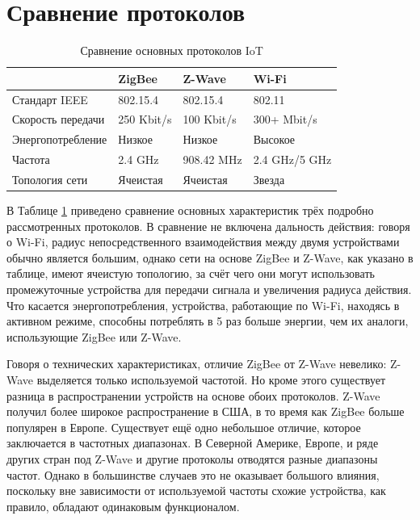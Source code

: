 	
	\section{Сравнение протоколов}
	
		\begin{table}[h]
		\centering
		\begin{tabular}{ | l | l | l | l | }
			\hline
			 & ZigBee & Z-Wave & Wi-Fi \\ \hline
			Стандарт IEEE & 802.15.4 & 802.15.4 & 802.11 \\ \hline
			Скорость передачи & 250 Kbit/s & 100 Kbit/s & 300+ Mbit/s \\ \hline
			Энергопотребление & Низкое & Низкое & Высокое \\ \hline
			Частота & 2.4 GHz  & 908.42 MHz & 2.4 GHz/5 GHz \\ \hline
			Топология сети & Ячеистая & Ячеистая & Звезда \\
			\hline
		\end{tabular}
		\caption{Сравнение основных протоколов IoT}
		\label{table 2}
	\end{table}

	В Таблице \ref{table 2} приведено сравнение основных характеристик трёх подробно рассмотренных
	протоколов. В сравнение не включена дальность действия: говоря о Wi-Fi, радиус непосредственного
	взаимодействия между двумя устройствами обычно является большим, однако сети на основе
	ZigBee и Z-Wave, как указано в таблице, имеют ячеистую топологию, за счёт чего они могут использовать
	промежуточные устройства для передачи сигнала и увеличения радиуса действия. Что касается 
	энергопотребления, устройства, работающие по Wi-Fi, находясь в активном режиме, способны потреблять
	в 5 раз больше энергии, чем их аналоги, использующие ZigBee или Z-Wave.
	
	Говоря о технических характеристиках, отличие ZigBee от Z-Wave невелико: Z-Wave выделяется только
	используемой частотой. Но кроме этого существует разница в распространении устройств на основе
	обоих протоколов. Z-Wave получил более широкое распространение в США, в то время как ZigBee больше
	популярен в Европе. Существует ещё одно небольшое отличие, которое заключается в частотных диапазонах. 
	В Северной Америке, 
	Европе, и ряде других стран под Z-Wave и другие протоколы отводятся разные диапазоны частот. Однако
	в большинстве случаев это не оказывает большого влияния, поскольку вне зависимости от используемой 
	частоты схожие устройства, как правило, обладают одинаковым функционалом.
	
